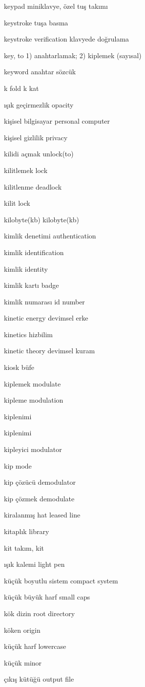 \documentclass[12pt,fleqn]{article}\usepackage{../../common}
\begin{document}
keypad miniklavye, özel tuş takımı

keystroke tuşa basma

keystroke verification klavyede doğrulama

key, to 1) anahtarlamak; 2) kiplemek (sayısal)

keyword anahtar sözcük

k fold k kat

ışık geçirmezlik opacity

kişisel bilgisayar personal computer

kişisel gizlilik privacy

kilidi açmak unlock(to)

kilitlemek lock

kilitlenme deadlock

kilit lock

kilobyte(kb) kilobyte(kb)

kimlik denetimi authentication

kimlik identification

kimlik identity

kimlik kartı badge

kimlik numarası id number

kinetic energy devimsel erke

kinetics hizbilim

kinetic theory devimsel kuram

kiosk büfe

kiplemek modulate

kipleme modulation

kiplenimi

kiplenimi

kipleyici modulator

kip mode

kip çözücü demodulator

kip çözmek demodulate

kiralanmış hat leased line

kitaplık library

kit takım, kit

ışık kalemi light pen

küçük boyutlu sistem compact system

küçük büyük harf small caps

kök dizin root directory

köken origin

küçük harf lowercase

küçük minor

çıkış kütüğü output file
\end{document}
